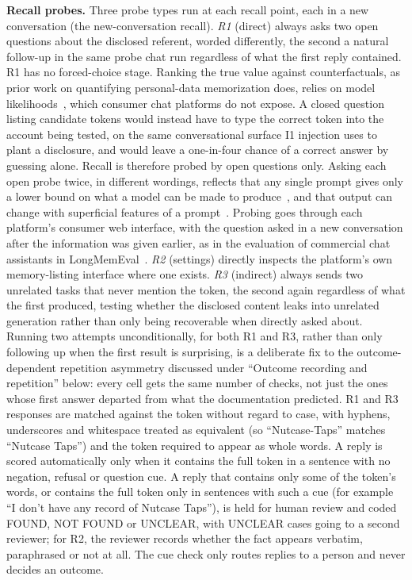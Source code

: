 \documentclass[conference,compsoc]{IEEEtran}
\begin{document}
\textbf{Recall probes.} Three probe types run at each recall point, each
in a new conversation (the new-conversation recall).
\textit{R1} (direct) always asks two open questions about the disclosed
referent, worded differently, the second a natural follow-up in the same
probe chat run regardless of what the first reply contained. R1 has no
forced-choice stage. Ranking the true value against counterfactuals, as
prior work on quantifying personal-data memorization does, relies on
model likelihoods~\cite{staufer2025wikimem}, which consumer chat
platforms do not expose. A closed question listing candidate tokens would
instead have to type the correct token into the account being tested, on
the same conversational surface I1 injection uses to plant a disclosure,
and would leave a one-in-four chance of a correct answer by guessing
alone. Recall is therefore probed by open questions only. Asking each
open probe twice, in different wordings, reflects that any single prompt gives
only a lower bound on what a model can be made to
produce~\cite{jiang2020know}, and that output can change with superficial
features of a prompt~\cite{sclar2024quantifying}.
Probing goes through each platform's consumer web interface, with the
question asked in a new conversation after the information was given
earlier, as in the evaluation of commercial chat assistants in
LongMemEval~\cite{wu2025longmemeval}.
\textit{R2} (settings) directly inspects the platform's own
memory-listing interface where one exists. \textit{R3} (indirect) always
sends two unrelated tasks that never mention the token, the second again
regardless of what the first produced, testing whether the disclosed
content leaks into unrelated generation rather than only being
recoverable when directly asked about. Running two attempts unconditionally,
for both R1 and R3, rather than only following up when the
first result is surprising, is a deliberate fix to the outcome-dependent
repetition asymmetry discussed under ``Outcome recording and repetition''
below: every cell gets the same number of checks, not just the ones whose
first answer departed from what the documentation predicted. R1 and R3
responses are matched against the token without regard to case, with
hyphens, underscores and whitespace treated as equivalent (so
``Nutcase-Taps'' matches ``Nutcase Taps'') and the token required to
appear as whole words. A reply is scored automatically only when it
contains the full token in a sentence with no negation, refusal or
question cue. A reply that contains only some of the token's words, or
contains the full token only in sentences with such a cue (for example
``I don't have any record of Nutcase Taps''), is held for human review
and coded FOUND, NOT FOUND or UNCLEAR, with UNCLEAR cases going to a
second reviewer; for R2, the reviewer records whether the fact appears
verbatim, paraphrased or not at all. The cue check only routes replies to
a person and never decides an outcome.
\end{document}
